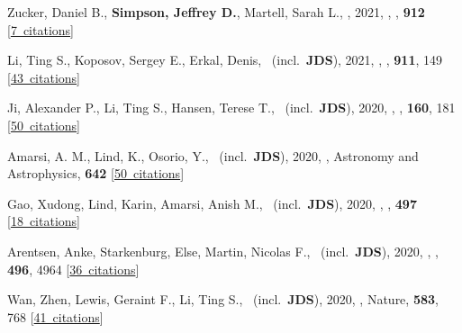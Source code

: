 \item[{\color{numcolor}\scriptsize53}] Zucker, Daniel B., \textbf{Simpson, Jeffrey D.}, Martell, Sarah L., \etal, 2021, , \apj, \textbf{912} [\href{https://ui.adsabs.harvard.edu/#abs/2021ApJ...912L..30Z}{7~citations}]

\item[{\color{numcolor}\scriptsize52}] Li, Ting S., Koposov, Sergey E., Erkal, Denis, \etal\ (incl.\ \textbf{JDS}), 2021, , \apj, \textbf{911}, 149 [\href{https://ui.adsabs.harvard.edu/#abs/2021ApJ...911..149L}{43~citations}]

\item[{\color{numcolor}\scriptsize51}] Ji, Alexander P., Li, Ting S., Hansen, Terese T., \etal\ (incl.\ \textbf{JDS}), 2020, , \aj, \textbf{160}, 181 [\href{https://ui.adsabs.harvard.edu/#abs/2020AJ....160..181J}{50~citations}]

\item[{\color{numcolor}\scriptsize50}] Amarsi, A. M., Lind, K., Osorio, Y., \etal\ (incl.\ \textbf{JDS}), 2020, , Astronomy and Astrophysics, \textbf{642} [\href{https://ui.adsabs.harvard.edu/#abs/2020A&A...642A..62A}{50~citations}]

\item[{\color{numcolor}\scriptsize49}] Gao, Xudong, Lind, Karin, Amarsi, Anish M., \etal\ (incl.\ \textbf{JDS}), 2020, , \mnras, \textbf{497} [\href{https://ui.adsabs.harvard.edu/#abs/2020MNRAS.497L..30G}{18~citations}]

\item[{\color{numcolor}\scriptsize48}] Arentsen, Anke, Starkenburg, Else, Martin, Nicolas F., \etal\ (incl.\ \textbf{JDS}), 2020, , \mnras, \textbf{496}, 4964 [\href{https://ui.adsabs.harvard.edu/#abs/2020MNRAS.496.4964A}{36~citations}]

\item[{\color{numcolor}\scriptsize47}] Wan, Zhen, Lewis, Geraint F., Li, Ting S., \etal\ (incl.\ \textbf{JDS}), 2020, , Nature, \textbf{583}, 768 [\href{https://ui.adsabs.harvard.edu/#abs/2020Natur.583..768W}{41~citations}]

